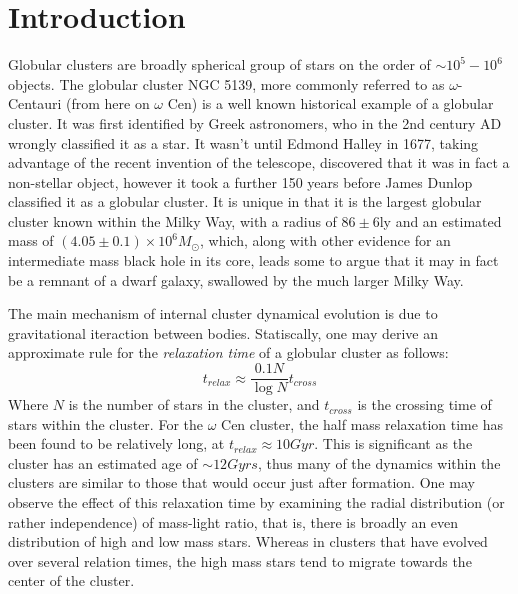 \documentclass[aps,
                pra,  
                a4paper, 
                amsmath, 
                amssymb, 
                preprint,
                tightenlines,  
                amsfonts,
                nofootinbib,
                notitlepage
            ]{revtex4-2}
\begin{document}
\section{Introduction}
Globular clusters are broadly spherical group of stars on the order of $\sim10^5-10^6$ objects. The globular cluster NGC 5139, more commonly referred to as $\omega$-Centauri (from here on $\omega$ Cen) is a well known historical example of a globular cluster. It was first identified by Greek astronomers, who in the 2nd century AD wrongly classified it as a star. It wasn't until Edmond Halley in 1677, taking advantage of the recent invention of the telescope, discovered that it was in fact a non-stellar object, however it took a further 150 years before James Dunlop classified it as a globular cluster. It is unique in that it is the largest globular cluster known within the Milky Way, with a radius of $86\pm6$ly and an estimated mass of $(4.05\pm0.1)\times10^6M_{\odot}$, which, along with other evidence for an intermediate mass black hole in its core, leads some to argue that it may in fact be a remnant of a dwarf galaxy, swallowed by the much larger Milky Way.
\par
The main mechanism of internal cluster dynamical evolution is due to gravitational iteraction between bodies. Statiscally, one may derive an approximate rule for the \textit{relaxation time} of a globular cluster as follows:
\begin{equation}
    t_{relax}\approx\frac{0.1N}{\log{N}}t_{cross}
\end{equation}
Where $N$ is the number of stars in the cluster, and $t_{cross}$ is the crossing time of stars within the cluster. For the $\omega$ Cen cluster, the half mass relaxation time has been found to be relatively long, at $t_{relax}\approx 10Gyr$. This is significant as the cluster has an estimated age of $\sim 12Gyrs$, thus many of the dynamics within the clusters are similar to those that would occur just after formation. One may observe the effect of this relaxation time by examining the radial distribution (or rather independence) of mass-light ratio, that is, there is broadly an even distribution of high and low mass stars. Whereas in clusters that have evolved over several relation times, the high mass stars tend to migrate towards the center of the cluster.
\par
\end{document}
